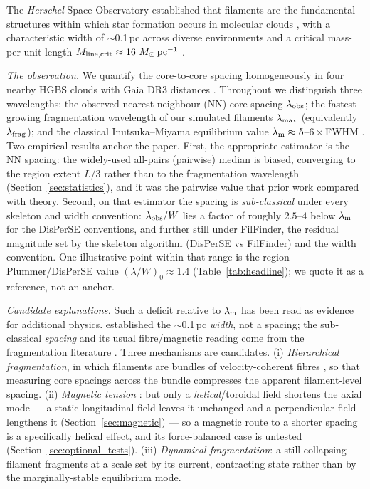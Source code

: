 \documentclass[usenatbib,twoside,twocolumn]{mnras}
\begin{document}
The \textit{Herschel} Space Observatory established that filaments are the fundamental structures within which star formation occurs in molecular clouds \citep{Andre2010}, with a characteristic width of $\sim$0.1\,pc across diverse environments \citep{Arzoumanian2011} and a critical mass-per-unit-length $M_{\rm line,crit}\approx16~M_\odot\,{\rm pc^{-1}}$ \citep{Ostriker1964}.

\emph{The observation.} We quantify the core-to-core spacing homogeneously in four nearby HGBS clouds with Gaia DR3 distances \citep{Zhang2023}. Throughout we distinguish three wavelengths: the observed nearest-neighbour (NN) core spacing $\lambda_{\rm obs}$; the fastest-growing fragmentation wavelength of our simulated filaments $\lambda_{\rm max}$ (equivalently $\lambda_{\rm frag}$); and the classical Inutsuka--Miyama equilibrium value $\lambda_{\rm m}\approx5$--$6\times$FWHM \citep{Inutsuka1992,Fischera2012}. Two empirical results anchor the paper. First, the appropriate estimator is the NN spacing: the widely-used all-pairs (pairwise) median is biased, converging to the region extent $L/3$ rather than to the fragmentation wavelength (Section~\ref{sec:statistics}), and it was the pairwise value that prior work compared with theory. Second, on that estimator the spacing is \emph{sub-classical} under every skeleton and width convention: $\lambda_{\rm obs}/W$ lies a factor of roughly $2.5$--$4$ below $\lambda_{\rm m}$ for the DisPerSE conventions, and further still under FilFinder, the residual magnitude set by the skeleton algorithm (DisPerSE vs FilFinder) and the width convention. One illustrative point within that range is the region-Plummer/DisPerSE value $(\lambda/W)_0\approx1.4$ (Table~\ref{tab:headline}); we quote it as a reference, not an anchor.

\emph{Candidate explanations.} Such a deficit relative to $\lambda_{\rm m}$ has been read as evidence for additional physics. \citet{Arzoumanian2019} established the $\sim$0.1\,pc \emph{width}, not a spacing; the sub-classical \emph{spacing} and its usual fibre/magnetic reading come from the fragmentation literature \citep{Fischera2012,Zhang2023cal}. Three mechanisms are candidates. (i) \emph{Hierarchical fragmentation}, in which filaments are bundles of velocity-coherent fibres \citep{Hacar2013,Hacar2018,Yang2024}, so that measuring core spacings across the bundle compresses the apparent filament-level spacing. (ii) \emph{Magnetic tension} \citep{Nakamura1993}: but only a \emph{helical}/toroidal field shortens the axial mode --- a static longitudinal field leaves it unchanged and a perpendicular field lengthens it (Section~\ref{sec:magnetic}) --- so a magnetic route to a shorter spacing is a specifically helical effect, and its force-balanced case is untested (Section~\ref{sec:optional_tests}). (iii) \emph{Dynamical fragmentation}: a still-collapsing filament fragments at a scale set by its current, contracting state rather than by the marginally-stable equilibrium mode.
\end{document}
